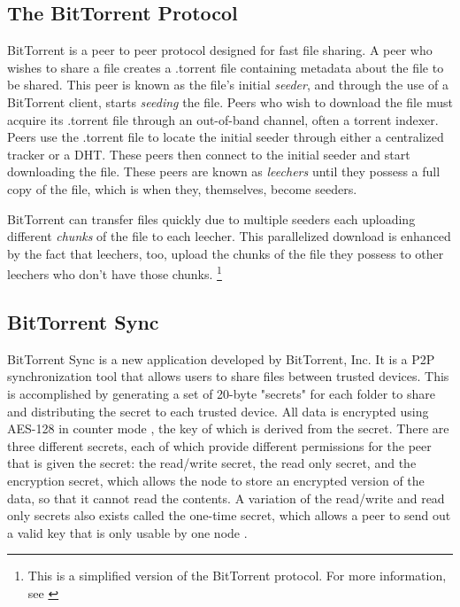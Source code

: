 \documentclass[a4paper]{article}
\begin{document}


\subsection{The BitTorrent Protocol}

BitTorrent is a peer to peer protocol designed for fast file sharing. A peer who wishes to share a file creates a .torrent file containing metadata about the file to be shared. This peer is known as the file's initial \textit{seeder}, and through the use of a BitTorrent client, starts \textit{seeding} the file. Peers who wish to download the file must acquire its .torrent file through an out-of-band channel, often a torrent indexer. Peers use the .torrent file to locate the initial seeder through either a centralized tracker or a DHT. These peers then connect to the initial seeder and start downloading the file. These peers are known as \textit{leechers} until they possess a full copy of the file, which is when they, themselves, become seeders.

BitTorrent can transfer files quickly due to multiple seeders each uploading different \textit{chunks} of the file to each leecher. This parallelized download is enhanced by the fact that leechers, too, upload the chunks of the file they possess to other leechers who don't have those chunks. \footnote {This is a simplified version of the BitTorrent protocol. For more information, see \cite{bittorrentProtocol}}

\subsection{BitTorrent Sync}
BitTorrent Sync is a new application developed by BitTorrent, Inc. It is a P2P synchronization tool that allows users to share files between trusted devices. This is accomplished by generating a set of 20-byte "secrets" for each folder to share and distributing the secret to each trusted device. All data is encrypted using AES-128 in counter mode \cite{btsynctech}, the key of which is derived from the secret. There are three different secrets, each of which provide different permissions for the peer that is given the secret: the read/write secret, the read only secret, and the encryption secret, which allows the node to store an encrypted version of the data, so that it cannot read the contents. A variation of the read/write and read only secrets also exists called the one-time secret, which allows a peer to send out a valid key that is only usable by one node \cite{btsyncuserguide}.
\end{document}
